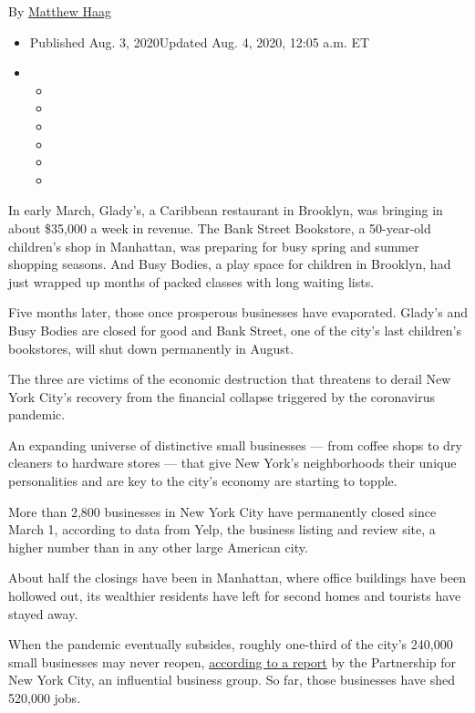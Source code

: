 By \href{https://www.nytimes.com/by/matthew-haag}{Matthew Haag}

\begin{itemize}
\item
  Published Aug. 3, 2020Updated Aug. 4, 2020, 12:05 a.m. ET
\item
  \begin{itemize}
  \item
  \item
  \item
  \item
  \item
  \item
  \end{itemize}
\end{itemize}

In early March, Glady's, a Caribbean restaurant in Brooklyn, was
bringing in about \$35,000 a week in revenue. The Bank Street Bookstore,
a 50-year-old children's shop in Manhattan, was preparing for busy
spring and summer shopping seasons. And Busy Bodies, a play space for
children in Brooklyn, had just wrapped up months of packed classes with
long waiting lists.

Five months later, those once prosperous businesses have evaporated.
Glady's and Busy Bodies are closed for good and Bank Street, one of the
city's last children's bookstores, will shut down permanently in August.

The three are victims of the economic destruction that threatens to
derail New York City's recovery from the financial collapse triggered by
the coronavirus pandemic.

An expanding universe of distinctive small businesses --- from coffee
shops to dry cleaners to hardware stores --- that give New York's
neighborhoods their unique personalities and are key to the city's
economy are starting to topple.

More than 2,800 businesses in New York City have permanently closed
since March 1, according to data from Yelp, the business listing and
review site, a higher number than in any other large American city.

About half the closings have been in Manhattan, where office buildings
have been hollowed out, its wealthier residents have left for second
homes and tourists have stayed away.

When the pandemic eventually subsides, roughly one-third of the city's
240,000 small businesses may never reopen,
\href{https://pfnyc.org/wp-content/uploads/2020/07/actionandcollaboration.pdf}{according
to a report} by the Partnership for New York City, an influential
business group. So far, those businesses have shed 520,000 jobs.

